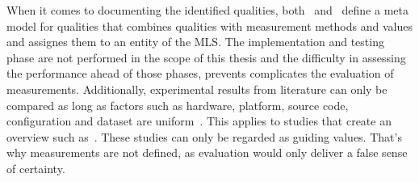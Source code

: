When it comes to documenting the identified qualities,
both~\cite{nakamichi_requirements-driven_2020} and~\cite{siebert_construction_2021} define a meta
model for qualities that combines qualities with
measurement methods and values and assignes them to an entity of the \ac{MLS}.
The implementation and testing phase are not performed in the scope of this thesis and the
difficulty in assessing the performance ahead of those phases, prevents complicates the evaluation
of measurements.
Additionally, experimental results from literature can only be compared as long as factors such as
hardware, platform, source code, configuration and dataset are uniform~\citep{arpteg_software_2018}.
This applies to studies that create an overview such as~\cite{chen_text_2021,long_scene_2021}.
These studies can only be regarded as guiding values.
That's why measurements are not defined, as evaluation would only deliver a false
sense of certainty.

